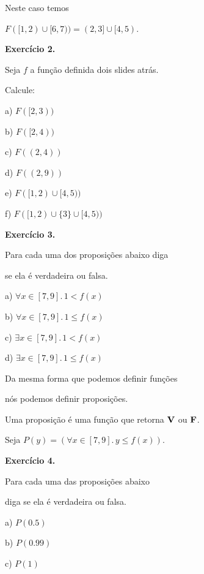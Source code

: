 \documentclass[oneside,12pt]{article}
\begin{document}
\bsk

Neste caso temos

$F([1,2) ∪ [6,7)) = (2,3] ∪ [4,5)$.


\newpage


{\bf Exercício 2.}

Seja $f$ a função definida dois slides atrás.

Calcule:

a) $F([2,3))$

b) $F([2,4))$

c) $F((2,4))$

d) $F((2,9))$

e) $F([1,2)∪[4,5))$

f) $F([1,2)∪\{3\}∪[4,5))$

\msk

\newpage


{\bf Exercício 3.}

Para cada uma dos proposições abaixo diga

se ela é verdadeira ou falsa.

a) $∀x∈[7,9]. \, 1<f(x)$

b) $∀x∈[7,9]. \, 1≤f(x)$

c) $∃x∈[7,9]. \, 1<f(x)$

d) $∃x∈[7,9]. \, 1≤f(x)$

\newpage



Da mesma forma que podemos definir funções

nós podemos definir proposições.

Uma proposição é uma função que retorna $\mathbf{V}$ ou $\mathbf{F}$.

Seja $P(y) = (∀x∈[7,9]. \, y≤f(x))$.

\msk

{\bf Exercício 4.}

Para cada uma das proposições abaixo

diga se ela é verdadeira ou falsa.

a) $P(0.5)$ 

b) $P(0.99)$ 

c) $P(1)$ 
\end{document}
